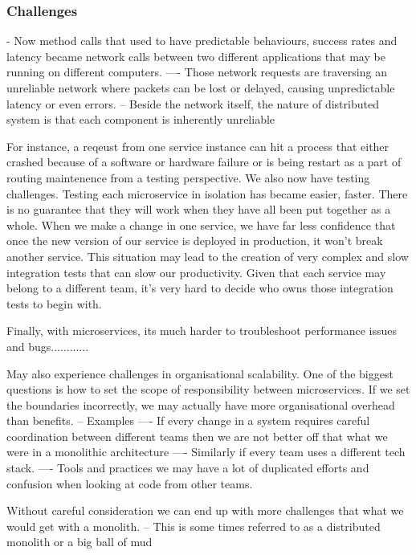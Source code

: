 \documentclass[a4paper, 11pt]{book}
\begin{document}
    \subsubsection{Challenges}
    - Now method calls that used to have predictable behaviours, success rates and latency became network calls between two different applications that may be running on different computers.
    ---- Those network requests are traversing an unreliable network where packets can be lost or delayed, causing unpredictable latency or even errors.
    -- Beside the network itself, the nature of distributed system is that each component is inherently unreliable

    For instance, a reqeust from one service instance can hit a process that either crashed because of a software or hardware failure or is being restart as a part of routing maintenence from a testing perspective.
    We also now have testing challenges.
    Testing each microservice in isolation has became easier, faster.
    There is no guarantee that they will work when they have all been put together as a whole.
    When we make a change in one service, we have far less confidence that once the new version of our service is deployed in production, it won't break another service.
    This situation may lead to the creation of very complex and slow integration tests that can slow our productivity.
    Given that each service may belong to a different team, it's very hard to decide who owns those integration tests to begin with.

    Finally, with microservices, its much harder to troubleshoot performance issues and bugs............

    May also experience challenges in organisational scalability.
    One of the biggest questions is how to set the scope of responsibility between microservices.
    If we set the boundaries incorrectly, we may actually have more organisational overhead than benefits.
    -- Examples
    ---- If every change in a system requires careful coordination between different teams then we are not better off that what we were in a monolithic architecture
    ---- Similarly if every team uses a different tech stack.
    ---- Tools and practices we may have a lot of duplicated efforts and confusion when looking at code from other teams.

    Without careful consideration we can end up with more challenges that what we would get with a monolith.
    -- This is some times referred to as a distributed monolith or a big ball of mud
\end{document}
